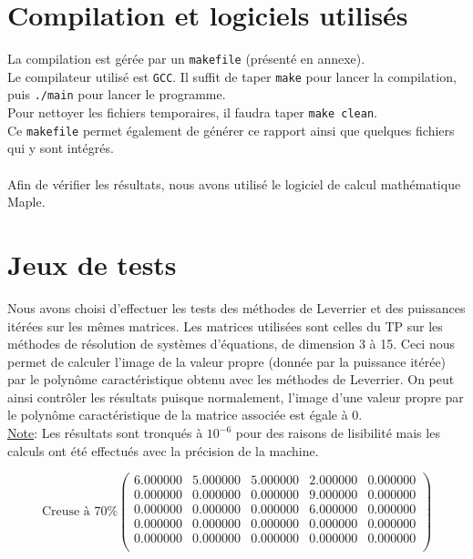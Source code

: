 \documentclass{report}
\begin{document}

\newpage


    \section{Compilation et logiciels utilisés}
      \noindent La compilation est gérée par un \verb"makefile" (présenté en annexe).\\
      Le compilateur utilisé est \verb"GCC".
      Il suffit de taper \verb"make" pour lancer la compilation, puis \verb"./main" pour lancer le programme.\\
      Pour nettoyer les fichiers temporaires, il faudra taper \verb"make clean".\\
      Ce \verb"makefile" permet également de générer ce rapport ainsi que quelques fichiers qui y sont intégrés.\\ \\      
      Afin de vérifier les résultats, nous avons utilisé le logiciel de calcul mathématique Maple.\\
    \newpage
    \section{Jeux de tests}
      Nous avons choisi d'effectuer les tests des méthodes de Leverrier et des puissances itérées sur les mêmes matrices. Les matrices utilisées sont celles du TP sur les méthodes de résolution de systèmes d'équations, de dimension 3 à 15. Ceci nous permet de calculer l'image de la valeur propre (donnée par la puissance itérée) par le polynôme caractéristique obtenu avec les méthodes de Leverrier. On peut ainsi contrôler les résultats puisque normalement, l'image d'une valeur propre par le polynôme caractéristique de la matrice associée est égale à 0. \\
      
      \underline{Note}: Les résultats sont tronqués à $10^{-6}$ pour des raisons de lisibilité mais les calculs ont été effectués avec la précision de la machine.
      
      \begin{equation}
	\textrm{Creuse à 70\%}
	\begin{pmatrix}
	  6.000000 & 5.000000 & 5.000000 & 2.000000 & 0.000000 \\ 
	  0.000000 & 0.000000 & 0.000000 & 9.000000 & 0.000000 \\ 
	  0.000000 & 0.000000 & 0.000000 & 6.000000 & 0.000000 \\ 
	  0.000000 & 0.000000 & 0.000000 & 0.000000 & 0.000000 \\ 
	  0.000000 & 0.000000 & 0.000000 & 0.000000 & 0.000000 \\ 
	\end{pmatrix}
	\label{syst1}
      \end{equation}
	
\end{document}
